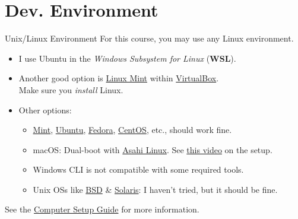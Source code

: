 \documentclass[14pt,aspectratio=1610]{beamer}
\begin{document}
\section{Dev. Environment}


\begin{frame}{Unix/Linux Environment}
For this course, you may use any Linux environment.
\begin{itemize}
\item
  I use Ubuntu in the \textit{Windows Subsystem for Linux} (\textbf{WSL}).
\item
  Another good option is \href{https://linuxmint.com/}{Linux Mint} within \href{https://www.virtualbox.org/}{VirtualBox}.\\
  Make sure you \emph{install} Linux.
\item Other options:
  \begin{itemize}
  \item \href{https://linuxmint.com/}{Mint}, \href{https://ubuntu.com}{Ubuntu}, \href{https://getfedora.org/}{Fedora},
    \href{https://www.centos.org/}{CentOS}, etc., should work fine.
  \item macOS: Dual-boot with \href{https://asahilinux.org/}{Asahi Linux}. See \href{https://youtu.be/10thOSWGrpc}{this video} on the setup.
  \item Windows CLI is not compatible with some required tools.
  \item Unix OSs like \href{https://en.wikipedia.org/wiki/Berkeley_Software_Distribution}{BSD} \& \href{https://www.oracle.com/solaris}{Solaris}: I haven't tried, but it should be fine.
  \end{itemize}
\end{itemize}
See the \href{https://csu-cs.github.io/csci-315/guides/setup-overview}{Computer Setup Guide} for more information.
\end{frame}
\end{document}
